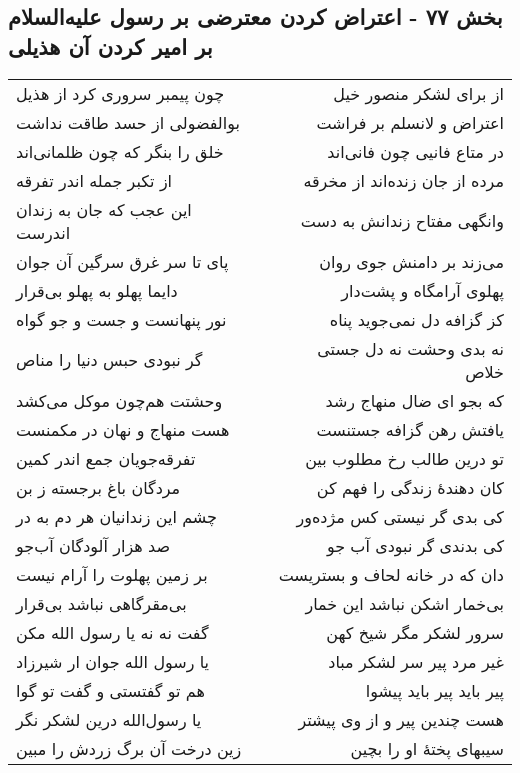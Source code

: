 \begin{center}
\section*{بخش ۷۷ - اعتراض کردن معترضی بر رسول علیه‌السلام بر امیر کردن آن هذیلی}
\label{sec:sh077}
\begin{longtable}{l p{0.5cm} r}
چون پیمبر سروری کرد از هذیل
&&
از برای لشکر منصور خیل
\\
بوالفضولی از حسد طاقت نداشت
&&
اعتراض و لانسلم بر فراشت
\\
خلق را بنگر که چون ظلمانی‌اند
&&
در متاع فانیی چون فانی‌اند
\\
از تکبر جمله اندر تفرقه
&&
مرده از جان زنده‌اند از مخرقه
\\
این عجب که جان به زندان اندرست
&&
وانگهی مفتاح زندانش به دست
\\
پای تا سر غرق سرگین آن جوان
&&
می‌زند بر دامنش جوی روان
\\
دایما پهلو به پهلو بی‌قرار
&&
پهلوی آرامگاه و پشت‌دار
\\
نور پنهانست و جست و جو گواه
&&
کز گزافه دل نمی‌جوید پناه
\\
گر نبودی حبس دنیا را مناص
&&
نه بدی وحشت نه دل جستی خلاص
\\
وحشتت هم‌چون موکل می‌کشد
&&
که بجو ای ضال منهاج رشد
\\
هست منهاج و نهان در مکمنست
&&
یافتش رهن گزافه جستنست
\\
تفرقه‌جویان جمع اندر کمین
&&
تو درین طالب رخ مطلوب بین
\\
مردگان باغ برجسته ز بن
&&
کان دهندهٔ زندگی را فهم کن
\\
چشم این زندانیان هر دم به در
&&
کی بدی گر نیستی کس مژده‌ور
\\
صد هزار آلودگان آب‌جو
&&
کی بدندی گر نبودی آب جو
\\
بر زمین پهلوت را آرام نیست
&&
دان که در خانه لحاف و بستریست
\\
بی‌مقرگاهی نباشد بی‌قرار
&&
بی‌خمار اشکن نباشد این خمار
\\
گفت نه نه یا رسول الله مکن
&&
سرور لشکر مگر شیخ کهن
\\
یا رسول الله جوان ار شیرزاد
&&
غیر مرد پیر سر لشکر مباد
\\
هم تو گفتستی و گفت تو گوا
&&
پیر باید پیر باید پیشوا
\\
یا رسول‌الله درین لشکر نگر
&&
هست چندین پیر و از وی پیشتر
\\
زین درخت آن برگ زردش را مبین
&&
سیبهای پختهٔ او را بچین
\\

\end{longtable}
\end{center}
